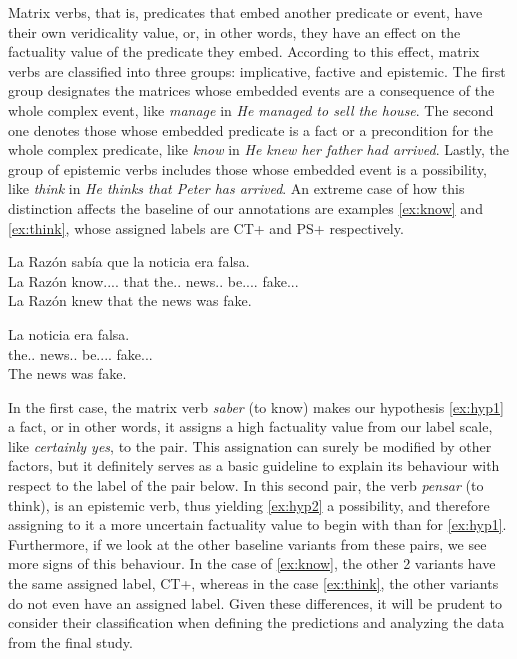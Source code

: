 Matrix verbs, that is, predicates that embed another predicate or event, have their own veridicality value, or, in other words, they have an effect on the factuality value of the predicate they embed. According to this effect, matrix verbs are classified into three groups: implicative, factive and epistemic. The first group designates the matrices whose embedded events are a consequence of the whole complex event, like \textit{manage} in \textit{He managed to sell the house}. The second one denotes those whose embedded predicate is a fact or a precondition for the whole complex predicate, like \textit{know} in \textit{He knew her father had arrived}. Lastly, the group of epistemic verbs includes those whose embedded event is a possibility, like \textit{think} in \textit{He thinks that Peter has arrived}. An extreme case of how this distinction affects the baseline of our annotations are examples \ref{ex:know} and \ref{ex:think}, whose assigned labels are CT+ and PS+ respectively.\\

\begin{exe}
  \ex\label{ex:know}
    \begin{xlist}
      \item{\gll La Razón sabía que la noticia era falsa.\\ La Razón know.\Pst.\Ipfv.\Ind.\Tsg{} that the.\F.\Sg{} news.\F.\Sg{} be.\Pst.\Ipfv.\Ind.\Tsg{} fake.\Ptcp.\M.\Sg{}\\\glt La Razón knew that the news was fake.}
      \item{\gll La noticia era falsa.\\ the.\F.\Sg{} news.\F.\Sg{} be.\Pst.\Ipfv.\Ind.\Tsg{} fake.\Ptcp.\M.\Sg{}\\\glt The news was fake.} \label{ex:hyp1}
    \end{xlist}
\end{exe}

In the first case, the matrix verb \textit{saber} (to know) makes our hypothesis \ref{ex:hyp1} a fact, or in other words, it assigns a high factuality value from our label scale, like \textit{certainly yes}, to the pair. This assignation can surely be modified by other factors, but it definitely serves as a basic guideline to explain its behaviour with respect to the label of the pair below. In this second pair, the verb \textit{pensar} (to think), is an epistemic verb, thus yielding \ref{ex:hyp2} a possibility, and therefore assigning to it a more uncertain factuality value to begin with than for \ref{ex:hyp1}. Furthermore, if we look at the other baseline variants from these pairs, we see more signs of this behaviour. In the case of \ref{ex:know}, the other 2 variants have the same assigned label, CT+, whereas in the case \ref{ex:think}, the other variants do not even have an assigned label. Given these differences, it will be prudent to consider their classification when defining the predictions and analyzing the data from the final study.\\

